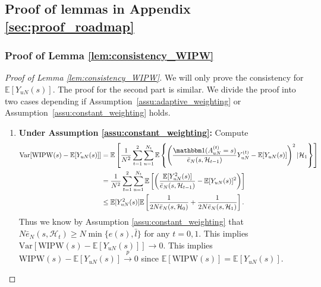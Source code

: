 \documentclass[12pt]{article}
\newcommand{\E}{\mathbb E}								%
\newcommand{\indicator}{\mathbbm 1}						%
\newcommand{\convp}{\overset p \rightarrow}             %
\newcommand{\WIPW}{\mathrm{WIPW}}
\begin{document}
\subsection{Proof of lemmas in Appendix \ref{sec:proof_roadmap}}\label{sec:proof_E_2}

\subsubsection{Proof of Lemma \ref{lem:consistency_WIPW}}\label{sec:proof_lem:consistency_WIPW}


\begin{proof}[Proof of Lemma \ref{lem:consistency_WIPW}]
	We will only prove the consistency for $\E[Y_{uN}(s)]$. The proof for the second part is similar. We divide the proof into two cases depending if Assumption~\ref{assu:adaptive_weighting} or Assumption~\ref{assu:constant_weighting} holds.
	\begin{enumerate}
		\item \textbf{Under Assumption \ref{assu:constant_weighting}:} Compute 
		\small
		\begin{align*}
			\mathrm{Var}[\WIPW(s)-\E[Y_{uN}(s)]]
			&
			=\E\left[\frac{1}{N^2}\sum_{t=1}^2\sum_{u=1}^{N_t}\E\left\{\left(\frac{\indicator(A_{uN}^{(t)}=s)}{\bar e_N(s,\mathcal{H}_{t-1})}Y_{uN}^{(t)}-\E[Y_{uN}(s)]\right)^2|\mathcal{H}_1\right\}\right]\\
			&
			=\frac{1}{N^2}\sum_{t=1}^2\sum_{u=1}^{N_t}\E\left[\left(\frac{\E[Y_{uN}^2(s)]}{\bar e_N(s,\mathcal{H}_{t-1})}-\E[Y_{uN}(s)]^2\right)\right]\\
			&
			\leq \E[Y_{uN}^2(s)]\E\left[\frac{1}{2N\bar e_N(s,\mathcal{H}_{0})}+\frac{1}{2N\bar e_N(s,\mathcal{H}_{1})}\right].
		\end{align*}
		\normalsize
		Thus we know by Assumption \ref{assu:constant_weighting} that $N\bar e_N(s,\mathcal{H}_t)\geq N\min\{e(s),\bar l\}$ for any $t=0,1$. This implies $\mathrm{Var}[\WIPW(s)-\E[Y_{uN}(s)]]\rightarrow0$. This implies $\WIPW(s)-\E[Y_{uN}(s)]\convp 0$ since $\E[\WIPW(s)]=\E[Y_{uN}(s)]$.


\end{enumerate}
\end{proof}
\end{document}
